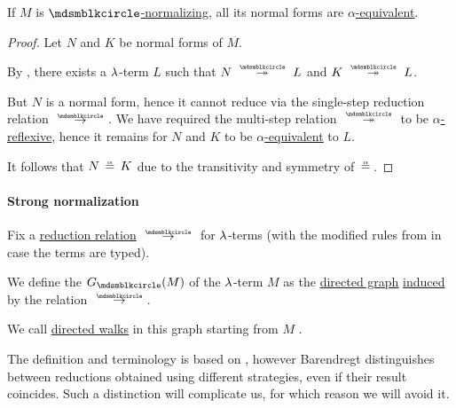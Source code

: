 \begin{proposition}\label{thm:lambda_term_normal_form_uniqueness}
  If \( M \) is \hyperref[def:lambda_term_normal_form]{\( \Anon \)-normalizing}, all its normal forms are \hyperref[def:lambda_term_alpha_equivalence]{\( \alpha \)-equivalent}.
\end{proposition}
\begin{proof}
  Let \( N \) and \( K \) be normal forms of \( M \).

  By , there exists a \( \mathrm{\lambda} \)-term \( L \) such that \( N \pred* L \) and \( K \pred* L \).

  But \( N \) is a normal form, hence it cannot reduce via the single-step reduction relation \( {\pred} \). We have required the multi-step relation \( {\pred*} \) to be \hyperref[def:alpha_reflexive]{\( \alpha \)-reflexive}, hence it remains for \( N \) and \( K \) to be \hyperref[def:lambda_term_alpha_equivalence]{\( \alpha \)-equivalent} to \( L \).

  It follows that \( N \aequiv K \) due to the transitivity and symmetry of \( {\aequiv} \).
\end{proof}

\paragraph{Strong normalization}

\begin{definition}\label{def:lambda_term_reduction_graph}\mimprovised
  Fix a \hyperref[def:lambda_term_reduction]{reduction relation} \( {\pred} \) for \( \mathrm{\lambda} \)-terms (with the modified rules from  in case the terms are typed).

  We define the  \( G_{\Anon}(M) \) of the \( \mathrm{\lambda} \)-term \( M \) as the \hyperref[def:directed_graph]{directed graph} \hyperref[def:directed_graph_induced_by_relation]{induced} by the relation \( {\pred} \).

  We call \hyperref[def:graph_walk/directed]{directed walks} in this graph starting from \( M \) .
\end{definition}
\begin{comments}
  \item The definition and terminology is based on , however Barendregt distinguishes between reductions obtained using different strategies, even if their result coincides. Such a distinction will complicate us, for which reason we will avoid it.
\end{comments}

